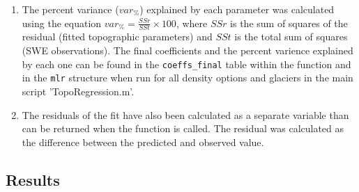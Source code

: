 \documentclass[12pt]{article}
\begin{document}
\begin{enumerate}
\item The percent variance ($var_\%$) explained by each parameter was calculated using the equation $var_\% = \frac{SSr}{SSt}\times 100$, where $SSr$ is the sum of squares of the residual (fitted topographic parameters) and $SSt$ is the total sum of squares (SWE observations). The final coefficients and the percent varience explained by each one can be found in the \texttt{coeffs\_final} table within the function and in the \texttt{mlr} structure when run for all density options and glaciers in the main script 'TopoRegression.m'.

\item The residuals of the fit have also been calculated as a separate variable than can be returned when the function is called. The residual was calculated as the difference between the predicted and observed value. 
\end{enumerate}


\subsection{Results}
\end{document}
